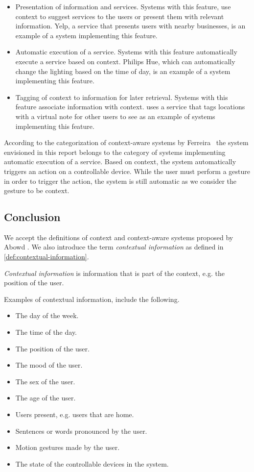 \begin{itemize}
\item Presentation of information and services. Systems with this feature, use context to suggest services to the users or present them with relevant information. Yelp, a service that presents users with nearby businesses, is an example of a system implementing this feature.
\item Automatic execution of a service. Systems with this feature automatically execute a service based on context. Philips Hue, which can automatically change the lighting based on the time of day, is an example of a system implementing this feature.
\item Tagging of context to information for later retrieval. Systems with this feature associate information with context. \cite{ferreira2014distributed} uses a service that tags locations with a virtual note for other users to see as an example of systems implementing this feature.
\end{itemize}

According to the categorization of context-aware systems by Ferreira \etal~the system envisioned in this report belongs to the category of systems implementing automatic execution of a service. Based on context, the system automatically triggers an action on a controllable device. While the user must perform a gesture in order to trigger the action, the system is still automatic as we consider the gesture to be context.

\subsection{Conclusion}

We accept the definitions of context and context-aware systems proposed by Abowd \etal. We also introduce the term \emph{contextual information} as defined in \cref{def:contextual-information}. 

\begin{definition}
\label{def:contextual-information}
\emph{Contextual information} is information that is part of the context, e.g. the position of the user.
\end{definition}

Examples of contextual information, include the following.

\begin{itemize}
\item The day of the week.
\item The time of the day.
\item The position of the user.
\item The mood of the user.
\item The sex of the user.
\item The age of the user.
\item Users present, e.g. users that are home.
\item Sentences or words pronounced by the user.
\item Motion gestures made by the user.
\item The state of the controllable devices in the system.
\end{itemize}

